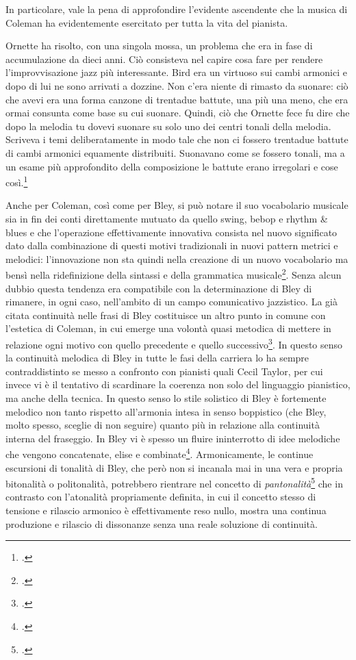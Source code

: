 In particolare, vale la pena di approfondire l'evidente ascendente che la musica di Coleman ha evidentemente esercitato per tutta la vita del pianista.
\begin{fquote}
	Ornette ha risolto, con una singola mossa, un problema che era in fase di accumulazione da dieci anni. Ciò consisteva nel capire cosa fare per rendere l'improvvisazione jazz più interessante. Bird era un virtuoso sui cambi armonici e dopo di lui ne sono arrivati a dozzine. Non c'era niente di rimasto da suonare: ciò che avevi era una forma canzone di trentadue battute, una più una meno, che era ormai consunta come base su cui suonare. Quindi, ciò che Ornette fece fu dire che dopo la melodia tu dovevi suonare su solo uno dei centri tonali della melodia. Scriveva i temi deliberatamente in modo tale che non ci fossero trentadue battute di cambi armonici equamente distribuiti. Suonavano come se fossero tonali, ma a un esame più approfondito della composizione le battute erano irregolari e cose così.\footcite[12]{downbeat74}
\end{fquote}
Anche per Coleman, così come per Bley, si può notare il suo vocabolario musicale sia in fin dei conti direttamente mutuato da quello swing, bebop e rhythm \& blues e che l'operazione effettivamente innovativa consista nel nuovo significato dato dalla combinazione di questi motivi tradizionali in nuovi pattern metrici e melodici: l'innovazione non sta quindi nella creazione di un nuovo vocabolario ma bensì nella ridefinizione della sintassi e della grammatica musicale\footcite[109]{cogswell}. Senza alcun dubbio questa tendenza era compatibile con la determinazione di Bley di rimanere, in ogni caso, nell'ambito di un campo comunicativo jazzistico. La già citata continuità nelle frasi di Bley costituisce un altro punto in comune con l'estetica di Coleman, in cui emerge una volontà quasi metodica di mettere in relazione ogni motivo con quello precedente e quello successivo\footcite[115]{cogswell}. In questo senso la continuità melodica di Bley in tutte le fasi della carriera lo ha sempre contraddistinto se messo a confronto con pianisti quali Cecil Taylor, per cui invece vi è il tentativo di scardinare la coerenza non solo del linguaggio pianistico, ma anche della tecnica. In questo senso lo stile solistico di Bley è fortemente melodico non tanto rispetto all'armonia intesa in senso boppistico (che Bley, molto spesso, sceglie di non seguire) quanto più in relazione alla continuità interna del fraseggio. In Bley vi è spesso un fluire ininterrotto di idee melodiche che vengono concatenate, elise e combinate\footcite[20]{meehan}. Armonicamente, le continue escursioni di tonalità di Bley, che però non si incanala mai in una vera e propria bitonalità o politonalità, potrebbero rientrare nel concetto di \textit{pantonalità}\footcite[73]{reti} che in contrasto con l'atonalità propriamente definita, in cui il concetto stesso di tensione e rilascio armonico è effettivamente reso nullo, mostra una continua produzione e rilascio di dissonanze senza una reale soluzione di continuità.\par
